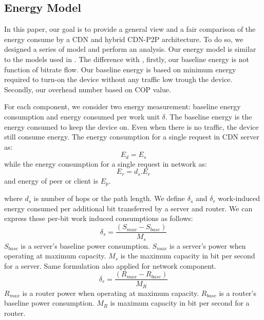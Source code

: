 \documentclass[conference]{IEEEtran}
\begin{document}
\subsection{Energy Model}\label{energy model}
In this paper, our goal is to provide a general view and a fair comparison of the energy consume by a CDN and hybrid CDN-P2P architecture. 
To do so, we designed a series of model and perform an analysis.
Our energy model is similar to the models used in \cite{Nedevschi:2008:HDC:1855610.1855618}.
The difference with \cite{Nedevschi:2008:HDC:1855610.1855618}, firstly, our baseline energy is not function of bitrate flow. 
Our baseline energy is based on minimum energy required to turn-on the device without any traffic low trough the device. 
Secondly, our overhead number based on COP value.

For each component, we consider two energy measurement:  baseline energy consumption and energy consumed per work unit $\delta$.
The baseline energy is the energy consumed to keep the device on.
Even when there is no traffic, the device still consume energy.
The energy consumption for a single request in CDN server as:
\begin{equation}\label{eqn:E_d}
	E_{d} = E_s
\end{equation}
while the energy consumption for a single request in network as:
\begin{equation}\label{eqn:E_r}
	E_{r} = d_s.E_r
\end{equation}
and energy of peer or client is $E_p$.

where $d_s$ is number of hops or the path length.
We define $\delta_s$ and $\delta_r$ work-induced energy consumed per additional bit transferred by a server and router.   
We can express these per-bit work induced consumptions as follows:
\begin{equation}\label{eqn:delta_s}
	\delta_s = \frac{(S_{max} - S_{base})}{M_s} 
\end{equation}
$S_{base}$ is a server's baseline power consumption.  
$S_{max}$ is a server's power when operating at maximum capacity.
$M_s$ is the maximum capacity in bit per second for a server.
Same formulation also applied for network component.  
\begin{equation}\label{eqn:delta_r}
	\delta_r = \frac{(R_{max} - R_{base})}{M_R} 
\end{equation}
$R_{max}$ is a router power when operating at maximum capacity.
$R_{base}$ is a router's baseline power consumption.
$M_R$ is maximum capacity in bit per second for a router.
\end{document}
